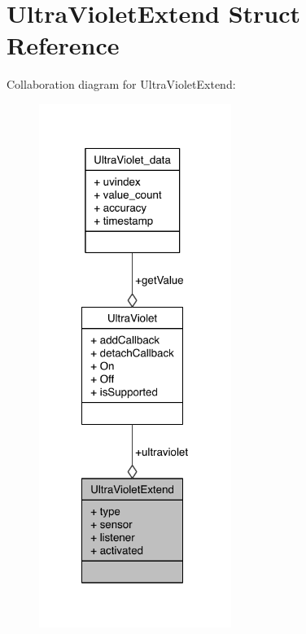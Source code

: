 \section{Ultra\-Violet\-Extend Struct Reference}
\label{structUltraVioletExtend}


Collaboration diagram for Ultra\-Violet\-Extend\-:
\nopagebreak
\begin{figure}[H]
\begin{center}
\leavevmode
\includegraphics[width=177pt]{structUltraVioletExtend__coll__graph}
\end{center}
\end{figure}
